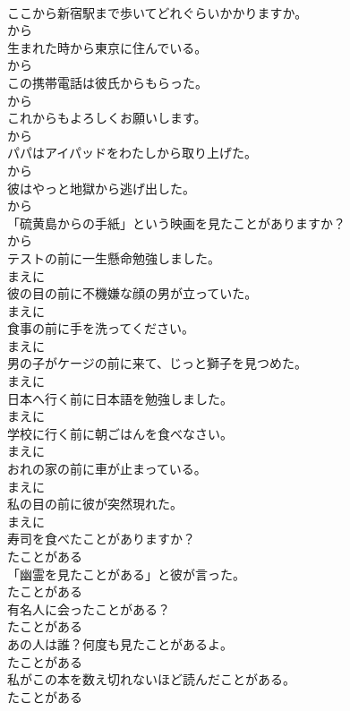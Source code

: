 \documentclass[8pt]{extreport}
\begin{document}
\begin{CJK}{UTF8}{min}
\\	ここから新宿駅まで歩いてどれぐらいかかりますか。	
\\	から
\\	生まれた時から東京に住んでいる。	
\\	から
\\	この携帯電話は彼氏からもらった。	
\\	から
\\	これからもよろしくお願いします。	
\\	から
\\	パパはアイパッドをわたしから取り上げた。	
\\	から
\\	彼はやっと地獄から逃げ出した。	
\\	から
\\	「硫黄島からの手紙」という映画を見たことがありますか？	
\\	から
\\	テストの前に一生懸命勉強しました。	
\\	まえに
\\	彼の目の前に不機嫌な顔の男が立っていた。	
\\	まえに
\\	食事の前に手を洗ってください。	
\\	まえに
\\	男の子がケージの前に来て、じっと獅子を見つめた。	
\\	まえに
\\	日本へ行く前に日本語を勉強しました。	
\\	まえに
\\	学校に行く前に朝ごはんを食べなさい。	
\\	まえに
\\	おれの家の前に車が止まっている。	
\\	まえに
\\	私の目の前に彼が突然現れた。	
\\	まえに
\\	寿司を食べたことがありますか？	
\\	たことがある
\\	「幽霊を見たことがある」と彼が言った。	
\\	たことがある
\\	有名人に会ったことがある？	
\\	たことがある
\\	あの人は誰？何度も見たことがあるよ。	
\\	たことがある
\\	私がこの本を数え切れないほど読んだことがある。	
\\	たことがある

\end{CJK}
\end{document}
